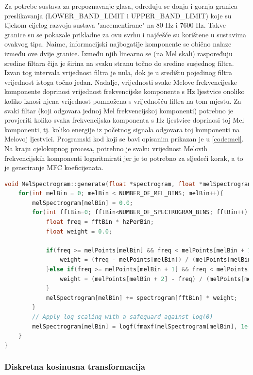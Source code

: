 Za potrebe sustava za prepoznavanje glasa, određuju se donja i gornja granica preslikavanja 
(LOWER\_BAND\_LIMIT i UPPER\_BAND\_LIMIT) koje su tijekom cijelog razvoja sustava "zacementirane"
na 80 Hz i 7600 Hz. Takve granice su se pokazale prikladne za ovu svrhu i najčešće
su korištene u sustavima ovakvog tipa. Naime, informacijski najbogatije komponente
se obično nalaze između ove dvije granice. Između njih linearno se (na Mel skali) raspoređuju sredine filtara čija je širina na svaku stranu 
točno do sredine susjednog filtra. Izvan tog intervala vrijednost filtra je nula, dok je u središtu
pojedinog filtra vrijednost istoga točno jedan. Nadalje, vrijednosti svake Melove frekvencijeske
komponente doprinosi vrijednost frekvencijske komponente s Hz ljestvice onoliko koliko iznosi
njena vrijednost pomnožena s vrijednošću filtra na tom mjestu. Za svaki filtar (koji odgovara
jednoj Mel frekvencijskoj komponenti) potrebno je provjeriti koliko svaka frekvencijska komponenta 
s Hz ljestvice doprinosi toj Mel komponenti, tj. koliko energije iz početnog signala
odgovara toj komponenti na Melovoj ljestvici. Programski kod koji se bavi opisanim prikazan je u 
\ref{code:mel}. Na kraju cjelokupnog procesa, potrebno je svaku vrijednost Melovih frekvencijskih
komponenti logaritmirati jer je to potrebno za sljedeći korak, a to je generiranje MFC koeficijenata.

\begin{lstlisting}[language=C++, caption=FFT, label=code:mel]
void MelSpectrogram::generate(float *spectrogram, float *melSpectrogram){
    for(int melBin = 0; melBin < NUMBER_OF_MEL_BINS; melBin++){
        melSpectrogram[melBin] = 0.0;
        for(int fftBin=0; fftBin<NUMBER_OF_SPECTROGRAM_BINS; fftBin++){
            float freq = fftBin * hzPerBin;
            float weight = 0.0;

            if(freq >= melPoints[melBin] && freq < melPoints[melBin + 1]){
                weight = (freq - melPoints[melBin]) / (melPoints[melBin + 1] - melPoints[melBin]);
            }else if(freq >= melPoints[melBin + 1] && freq < melPoints[melBin + 2]){
                weight = (melPoints[melBin + 2] - freq) / (melPoints[melBin + 2] - melPoints[melBin + 1]);
            }
            melSpectrogram[melBin] += spectrogram[fftBin] * weight;
        }
        // Apply log scaling with a safeguard against log(0)
        melSpectrogram[melBin] = logf(fmaxf(melSpectrogram[melBin], 1e-6));
    }
}
\end{lstlisting}

\subsubsection{Diskretna kosinusna transformacija}

